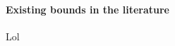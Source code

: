 \documentclass[../main.tex]{subfiles}
\begin{document}
\paragraph{Existing bounds in the literature}\label{par:bounds_lit}
Lol
\end{document}
